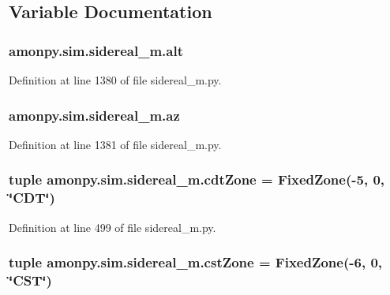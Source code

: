 \subsection{Variable Documentation}
\hypertarget{namespaceamonpy_1_1sim_1_1sidereal__m_ab721886185ef9c5711e34db16db8dd4a}{
\subsubsection[{alt}]{\setlength{\rightskip}{0pt plus 5cm}amonpy.\-sim.\-sidereal\-\_\-m.\-alt}}\label{namespaceamonpy_1_1sim_1_1sidereal__m_ab721886185ef9c5711e34db16db8dd4a}


Definition at line 1380 of file sidereal\-\_\-m.\-py.

\hypertarget{namespaceamonpy_1_1sim_1_1sidereal__m_a32333e199bbeaea7ea9ff8766639f54b}{
\subsubsection[{az}]{\setlength{\rightskip}{0pt plus 5cm}amonpy.\-sim.\-sidereal\-\_\-m.\-az}}\label{namespaceamonpy_1_1sim_1_1sidereal__m_a32333e199bbeaea7ea9ff8766639f54b}


Definition at line 1381 of file sidereal\-\_\-m.\-py.

\hypertarget{namespaceamonpy_1_1sim_1_1sidereal__m_a0eef9e52f3d63079c0d7b3a3c4b4071a}{
\subsubsection[{cdt\-Zone}]{\setlength{\rightskip}{0pt plus 5cm}tuple amonpy.\-sim.\-sidereal\-\_\-m.\-cdt\-Zone = {\bf Fixed\-Zone}(-\/5, 0, \char`\"{}C\-D\-T\char`\"{})}}\label{namespaceamonpy_1_1sim_1_1sidereal__m_a0eef9e52f3d63079c0d7b3a3c4b4071a}


Definition at line 499 of file sidereal\-\_\-m.\-py.

\hypertarget{namespaceamonpy_1_1sim_1_1sidereal__m_a06155fc3f17c03e1aabd0ca129327824}{
\subsubsection[{cst\-Zone}]{\setlength{\rightskip}{0pt plus 5cm}tuple amonpy.\-sim.\-sidereal\-\_\-m.\-cst\-Zone = {\bf Fixed\-Zone}(-\/6, 0, \char`\"{}C\-S\-T\char`\"{})}}\label{namespaceamonpy_1_1sim_1_1sidereal__m_a06155fc3f17c03e1aabd0ca129327824}


